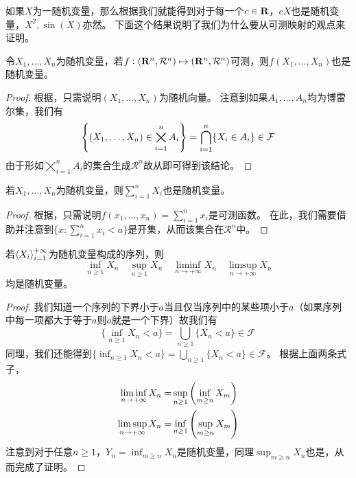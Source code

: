 \documentclass[../main.tex]{subfiles}
\begin{document}
如果\(X\)为一随机变量，那么根据我们就能得到对于每一个\(c\in\mathbf{R}\)，\(cX\)也是随机变量，\(X^2,\sin(X)\)亦然。
下面这个结果说明了我们为什么要从可测映射的观点来证明。
\begin{theorem}\label{thm:1.3.5}
	令\(X_1,\dots,X_n\)为随机变量，若\(f:(\mathbf{R}^n,\mathcal{R}^n)\mapsto(\mathbf{R}^n,\mathcal{R}^n)\)可测，则\(f(X_1,\dots,X_n)\)也是随机变量。
\end{theorem}
\begin{proof}
	根据，只需说明\((X_1,\dots,X_n)\)为随机向量。
	注意到如果\(A_1,\dots,A_n\)均为博雷尔集，我们有
	\[\cbr{(X_1,\dots,X_n)\in\bigtimes_{i=1}^nA_i}=\bigcap_{i=1}^n\{X_i\in A_i\}\in\mathcal{F}\]
	由于形如\(\bigtimes_{i=1}^nA_i\)的集合生成\(\mathcal{R}^n\)故从即可得到该结论。
\end{proof}

\begin{theorem}\label{thm:1.3.6}
	若\(X_1,\dots,X_n\)为随机变量，则\(\sum_{i=1}^n X_i\)也是随机变量。
\end{theorem}
\begin{proof}
	根据，只需说明\(f(x_1,\dots,x_n)=\sum_{i=1}^nx_i\)是可测函数。
	在此，我们需要借助并注意到\(\{x:\sum_{i=1}^nx_i<a\}\)是开集，从而该集合在\(\mathcal{R}^n\)中。
\end{proof}

\begin{theorem}\label{thm:1.3.7}
	若\(\left<X_i\right>_{i=1}^{+\infty}\)为随机变量构成的序列，则
	\[\inf_{n\geq1}X_n\quad \sup_{n\geq1}X_n\quad \liminf\limits_{n\rightarrow+\infty} X_n\quad \limsup\limits_{n\rightarrow+\infty} X_n\]
	均是随机变量。
\end{theorem}
\begin{proof}
	我们知道一个序列的下界小于\(a\)当且仅当序列中的某些项小于\(a\)（如果序列中每一项都大于等于\(a\)则\(a\)就是一个下界）故我们有
	\[\{\inf_{n\geq1}X_n<a\}=\bigcup_{n\geq1}\{X_n<a\}\in\mathcal{F}\]
	同理，我们还能得到\(\{\inf_{n\geq1}X_n<a\}=\bigcup_{n\geq1}\{X_n<a\}\in\mathcal{F}\)。
	根据上面两条式子，
	\begin{align*}
		\liminf\limits_{n\rightarrow+\infty}X_n=&\sup_{n\geq1}\del{\inf_{m\geq n}X_m}\\ \limsup\limits_{n\rightarrow+\infty}X_n=&\inf_{n\geq1}\del{\sup_{m\geq n}X_m}
	\end{align*}
	注意到对于任意\(n\geq 1\)，\(Y_n=\inf_{m\geq n}X_n\)是随机变量，同理\(\sup_{m\geq n}X_n\)也是，从而完成了证明。
\end{proof}
\end{document}
